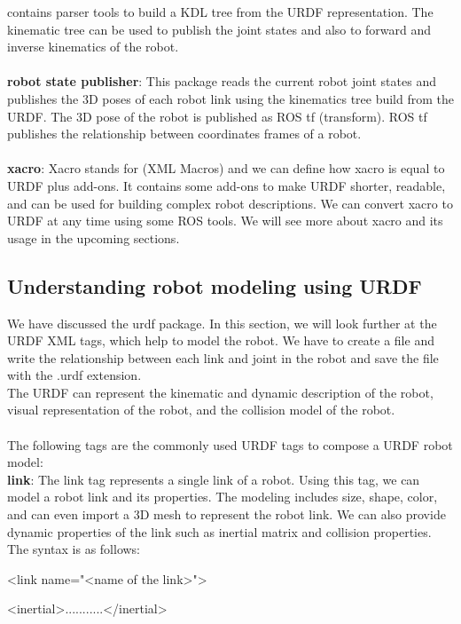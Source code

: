 	contains parser tools to build a KDL tree from the URDF representation. The kinematic 
	tree can be used to publish the joint states and also to forward and inverse 
	kinematics of the robot.
	\\\\\textbf{robot state publisher}: This package reads the current robot joint states 
	and publishes 
	the 3D poses of each robot link using the kinematics tree build from the URDF. The 3D 
	pose of the robot is published as ROS tf (transform). ROS tf publishes the 
	relationship 
	between coordinates frames of a robot.
	\\\\\textbf{xacro}: Xacro stands for (XML Macros) and we can define how xacro is equal 
	to URDF plus add-ons. It contains some add-ons to make URDF shorter, readable, and can 
	be used for building complex robot descriptions. We can convert xacro to URDF at any 
	time using some ROS tools. We will see more about xacro and its usage in the upcoming 
	sections.
	
	\subsection{Understanding robot modeling using URDF}
	
	We have discussed the urdf package. In this section, we will look further at the URDF XML tags, which help to model the robot. We have to create a file and write the relationship between each link and joint in the robot and save the file with the .urdf extension.
	\\The URDF can represent the kinematic and dynamic description of the robot, visual representation of the robot, and the collision model of the robot.
	\\\\The following tags are the commonly used URDF tags to compose a URDF robot model:
	\\ \textbf{link}: The link tag represents a single link of a robot. Using this tag, we can model a robot link and its properties. The modeling includes size, shape, color, and can even import a 3D mesh to represent the robot link. We can also provide dynamic properties of the link such as inertial matrix and collision properties.
	\\
	The syntax is as follows:
	
	<link name="<name of the link>">
	
	<inertial>...........</inertial>
	
